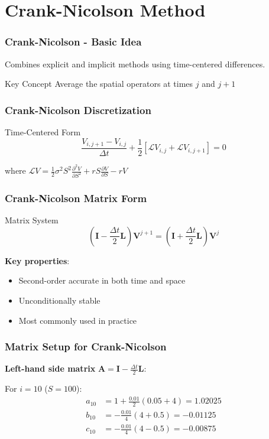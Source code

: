 \documentclass[aspectratio=169]{beamer}
\begin{document}
\section{Crank-Nicolson Method}

\begin{frame}
\frametitle{Crank-Nicolson - Basic Idea}
Combines explicit and implicit methods using time-centered differences.

\begin{block}{Key Concept}
Average the spatial operators at times \(j\) and \(j+1\)
\end{block}
\end{frame}

\begin{frame}
\frametitle{Crank-Nicolson Discretization}
\begin{block}{Time-Centered Form}
\[\frac{V_{i,j+1} - V_{i,j}}{\Delta t} + \frac{1}{2}\left[ \mathcal{L}V_{i,j} + \mathcal{L}V_{i,j+1} \right] = 0\]

where \(\mathcal{L}V = \frac{1}{2}\sigma^2 S^2 \frac{\partial^2 V}{\partial S^2} + rS \frac{\partial V}{\partial S} - rV\)
\end{block}
\end{frame}

\begin{frame}
\frametitle{Crank-Nicolson Matrix Form}
\begin{block}{Matrix System}
\[\left( \mathbf{I} - \frac{\Delta t}{2}\mathbf{L} \right) \mathbf{V}^{j+1} = \left( \mathbf{I} + \frac{\Delta t}{2}\mathbf{L} \right) \mathbf{V}^j\]
\end{block}

\textbf{Key properties}:
\begin{itemize}
\item Second-order accurate in both time and space
\item Unconditionally stable
\item Most commonly used in practice
\end{itemize}
\end{frame}

\begin{frame}
\frametitle{Matrix Setup for Crank-Nicolson}
\textbf{Left-hand side matrix} \(\mathbf{A} = \mathbf{I} - \frac{\Delta t}{2}\mathbf{L}\):

For \(i = 10\) (\(S = 100\)):
\begin{align}
a_{10} &= 1 + \frac{0.01}{2}(0.05 + 4) = 1.02025 \\
b_{10} &= -\frac{0.01}{4}(4 + 0.5) = -0.01125 \\
c_{10} &= -\frac{0.01}{4}(4 - 0.5) = -0.00875
\end{align}
\end{frame}
\end{document}

